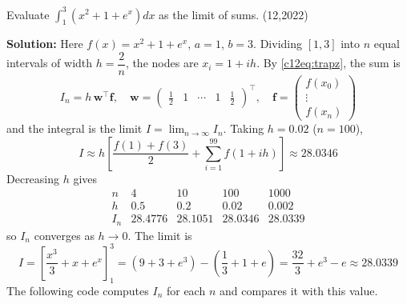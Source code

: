 \nopagebreak[4]
\begin{center}
\end{center}


\item Evaluate $\displaystyle\int_1^3 \left(x^2 + 1 + e^x\right)dx$ as the limit of sums. \hfill (12,2022)

\textbf{Solution:} Here $f(x) = x^2 + 1 + e^x$, $a = 1$, $b = 3$. Dividing $[1, 3]$ into $n$ equal intervals of width $h = \dfrac{2}{n}$, the nodes are $x_i = 1 + ih$. By \eqref{c12eq:trapz}, the sum is
\begin{equation}
I_n = h\,\mathbf{w}^{\top}\mathbf{f}, \quad
\mathbf{w} = \begin{pmatrix} \frac{1}{2} & 1 & \cdots & 1 & \frac{1}{2} \end{pmatrix}^{\top}, \quad
\mathbf{f} = \begin{pmatrix} f(x_0) \\ \vdots \\ f(x_n) \end{pmatrix}
\end{equation}
and the integral is the limit $I = \lim_{n\to\infty} I_n$. Taking $h = 0.02$ ($n = 100$),
\begin{equation}
I \approx h\left[\frac{f(1) + f(3)}{2} + \sum_{i=1}^{99} f(1 + ih)\right] \approx 28.0346
\end{equation}
Decreasing $h$ gives
\begin{equation}
\begin{array}{c|cccc}
n & 4 & 10 & 100 & 1000 \\ \hline
h & 0.5 & 0.2 & 0.02 & 0.002 \\
I_n & 28.4776 & 28.1051 & 28.0346 & 28.0339
\end{array}
\end{equation}
so $I_n$ converges as $h \to 0$. The limit is
\begin{equation}
I = \left[\frac{x^3}{3} + x + e^x\right]_1^3 = \left(9 + 3 + e^3\right) - \left(\frac{1}{3} + 1 + e\right) = \frac{32}{3} + e^3 - e \approx 28.0339
\end{equation}
The following code computes $I_n$ for each $n$ and compares it with this value.

\nopagebreak[4]
\begin{center}
\end{center}
